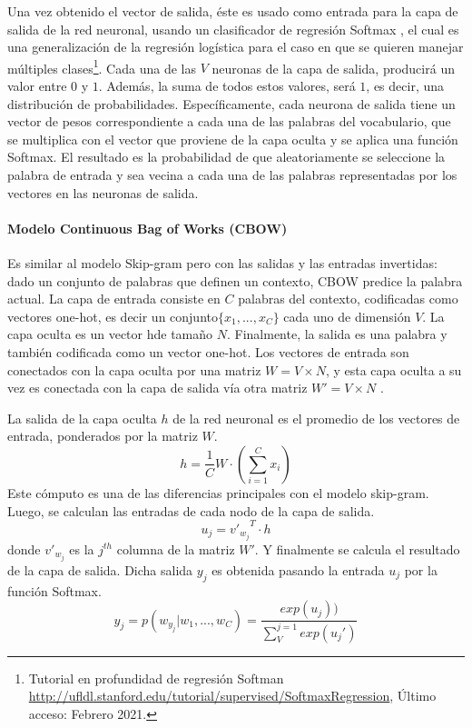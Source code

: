 \bigskip Una vez obtenido el vector de salida, éste es usado como entrada para la capa de salida de la red neuronal, usando un clasificador de regresión Softmax \citep{morin2005hierarchical}, el cual es una generalización de la regresión logística para el caso en que se quieren manejar múltiples clases\footnote{Tutorial en profundidad de regresión Softman \url{http://ufldl.stanford.edu/tutorial/supervised/SoftmaxRegression},  Último acceso: Febrero 2021.}. Cada una de las \(V\) neuronas de la capa de salida, producirá un valor entre \(0\) y \(1\). Además, la suma de todos estos valores, será \(1\), es decir, una distribución de probabilidades. Específicamente, cada neurona de salida tiene un vector de pesos correspondiente a cada una de las palabras del vocabulario, que se multiplica con el vector que proviene de la capa oculta y se aplica una función Softmax. El resultado es la probabilidad de que aleatoriamente se seleccione la palabra de entrada y sea vecina a cada una de las palabras representadas por los vectores en las neuronas de salida.

\paragraph{Modelo Continuous Bag of Works (CBOW)}
Es similar al modelo Skip-gram pero con las salidas y las entradas invertidas: dado un conjunto de palabras que definen un contexto, CBOW predice la palabra actual. La capa de entrada consiste en \(C\) palabras del contexto, codificadas como vectores one-hot, es decir un conjunto\( \{x_1,..., x_C\}\) cada uno de dimensión \(V\). La capa oculta es un vector hde tamaño \(N\). Finalmente, la salida es una palabra y también codificada como un vector one-hot. Los vectores de entrada son conectados con la capa oculta por una matriz \(W=V \times N\), y esta capa oculta a su vez es conectada con la capa de salida vía otra matriz \(W'=V \times N\) \citep{cbowmodel}.

\bigskip La salida de la capa oculta \(h\) de la red neuronal es el promedio de los vectores de entrada, ponderados por la matriz \(W\). 
\[h = \frac{1}{C}W \cdot (\sum_{i=1}^{C}{x_i})\]
Este cómputo es una de las diferencias principales con el modelo skip-gram. Luego, se calculan las entradas de cada nodo de la capa de salida.
\[u_j = {v'_{w_j}}^{T} \cdot h\]
donde \(v'_{w_j}\) es la \(j^{th}\) columna de la matriz \(W'\). Y finalmente se calcula el resultado de la capa de salida. Dicha salida \(y_j\) es obtenida pasando la entrada \(u_j\) por la función Softmax.
\[y_j=p(w_{y_j}|w_1,...,w_C)=\frac{exp(u_j))}{\sum_{V}^{j=1}exp(u_j')}\]

